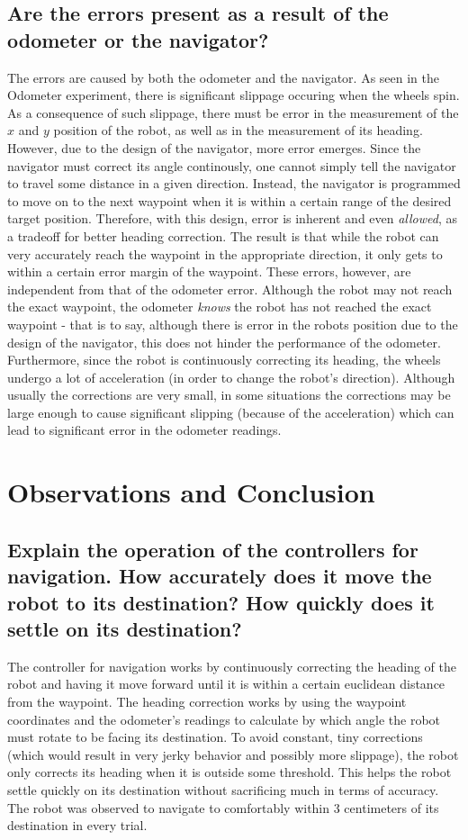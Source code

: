 \documentclass[11pt]{article}
\begin{document}
\subsection{Are the errors present as a result of the odometer or the navigator?}
The errors are caused by both the odometer and the navigator. As seen in the Odometer experiment, there
is significant slippage occuring when the wheels spin. As a consequence of such slippage, there must
be error in the measurement of the $x$ and $y$ position of the robot, as well as in the measurement
of its heading. \\
However, due to the design of the navigator, more error emerges. Since the navigator
must correct its angle continously, one cannot simply tell the navigator to travel some distance in
a given direction. Instead, the navigator is programmed to move on to the next waypoint when it is
within a certain range of the desired target position. Therefore, with this design, error is
inherent and even \textit{allowed}, as a tradeoff for better heading correction. The result is that
while the robot can very accurately reach the waypoint in the appropriate direction, it only gets
to within a certain error margin of the waypoint. These errors, however, are independent from that of
the odometer error. Although the robot may not reach the exact waypoint, the odometer \textit{knows}
the robot has not reached the exact waypoint - that is to say, although there is error in the robots
position due to the design of the navigator, this does not hinder the performance of the odometer.
\\
Furthermore, since the robot is continuously correcting its heading, the wheels undergo a lot of
acceleration (in order to change the robot's direction). Although usually the corrections are very
small, in some situations the corrections may be large enough to cause significant slipping (because
of the acceleration) which can lead to significant error in the odometer readings.

\section{Observations and Conclusion}
\subsection{Explain the operation of the controllers for navigation. How accurately does it move the
robot to its destination? How quickly does it settle on its destination?}
The controller for navigation works by continuously correcting the heading of the robot and having
it move forward until it is within a certain euclidean distance from the waypoint. The heading
correction works by using the waypoint coordinates and the odometer's
readings to calculate by which angle the robot must rotate to be facing its destination. To avoid
constant, tiny corrections (which would result in very jerky behavior and possibly more slippage),
the robot only corrects its heading when it is outside some threshold. This helps the robot settle
quickly on its destination without sacrificing much in terms of accuracy. The robot was observed to
navigate to comfortably within 3 centimeters of its destination in every trial.
\end{document}
